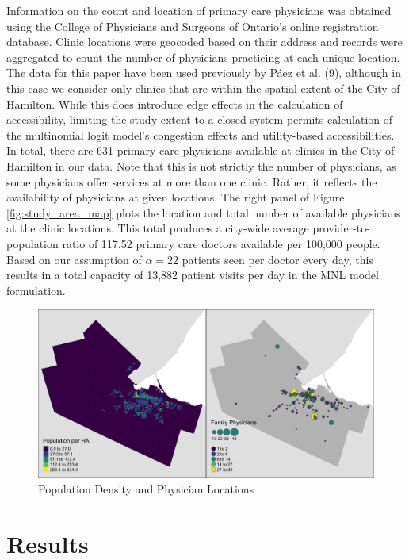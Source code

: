 \documentclass{article}
\begin{document}
Information on the count and location of primary care physicians was
obtained using the College of Physicians and Surgeons of Ontario's
online registration database. Clinic locations were geocoded based on
their address and records were aggregated to count the number of
physicians practicing at each unique location. The data for this paper
have been used previously by Páez et al. (9), although in this case we
consider only clinics that are within the spatial extent of the City of
Hamilton. While this does introduce edge effects in the calculation of
accessibility, limiting the study extent to a closed system permits
calculation of the multinomial logit model's congestion effects and
utility-based accessibilities. In total, there are 631 primary care
physicians available at clinics in the City of Hamilton in our data.
Note that this is not strictly the number of physicians, as some
physicians offer services at more than one clinic. Rather, it reflects
the availability of physicians at given locations. The right panel of
Figure \ref{fig:study_area_map} plots the location and total number of
available physicians at the clinic locations. This total produces a
city-wide average provider-to-population ratio of 117.52 primary care
doctors available per 100,000 people. Based on our assumption of
\(\alpha = 22\) patients seen per doctor every day, this results in a
total capacity of 13,882 patient visits per day in the MNL model
formulation.

\begin{figure}
\includegraphics[width=1\linewidth]{./img/study_area_map} \caption{\label{fig:study_area_map}Population Density and Physician Locations}\label{fig:plot study_area_map}
\end{figure}

\hypertarget{results}{%
\section{Results}\label{results}}
\end{document}
